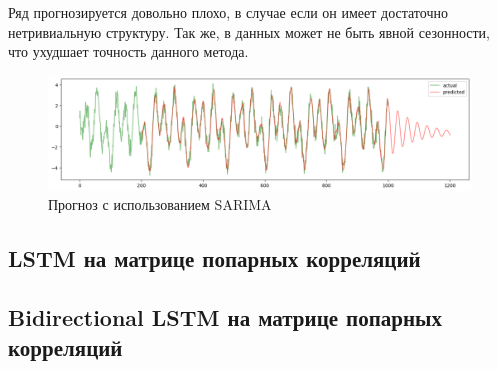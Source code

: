 \documentclass{article}
\begin{document}
Ряд прогнозируется довольно плохо, в случае если он имеет достаточно нетривиальную структуру. Так же, в данных может не быть явной сезонности, что ухудшает точность данного метода.

\begin{figure}[H]
	\centering
	\includegraphics[width=\textwidth]{SARIMA-prediction.png}
	\caption{Прогноз с использованием SARIMA}
	\label{fig:fig2}
\end{figure}

\subsection{LSTM на матрице попарных корреляций}

\subsection{Bidirectional LSTM на матрице попарных корреляций}





\end{document}
